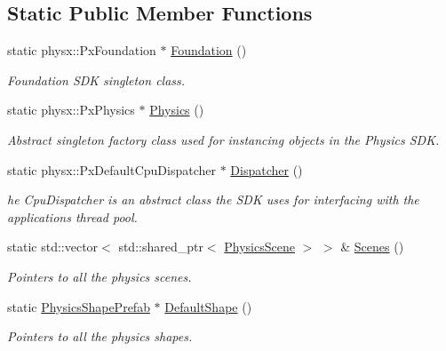 \subsection*{Static Public Member Functions}
\begin{DoxyCompactItemize}
\item 
static physx\+::\+Px\+Foundation $\ast$ \mbox{\hyperlink{classrev_1_1_physics_manager_a3c3cdc497203c68d9189d1a2baf97e54}{Foundation}} ()
\begin{DoxyCompactList}\small\item\em Foundation S\+DK singleton class. \end{DoxyCompactList}\item 
static physx\+::\+Px\+Physics $\ast$ \mbox{\hyperlink{classrev_1_1_physics_manager_af406b7c9e1807bd55d25a2c3cc74a5ff}{Physics}} ()
\begin{DoxyCompactList}\small\item\em Abstract singleton factory class used for instancing objects in the Physics S\+DK. \end{DoxyCompactList}\item 
static physx\+::\+Px\+Default\+Cpu\+Dispatcher $\ast$ \mbox{\hyperlink{classrev_1_1_physics_manager_a28fdf900280695b969f127fab9c3e7f6}{Dispatcher}} ()
\begin{DoxyCompactList}\small\item\em he Cpu\+Dispatcher is an abstract class the S\+DK uses for interfacing with the application\textquotesingle{}s thread pool. \end{DoxyCompactList}\item 
\mbox{\label{classrev_1_1_physics_manager_a823d9349e40c0c08845bf3ae6db149fb}} 
static std\+::vector$<$ std\+::shared\+\_\+ptr$<$ \mbox{\hyperlink{classrev_1_1_physics_scene}{Physics\+Scene}} $>$ $>$ \& \mbox{\hyperlink{classrev_1_1_physics_manager_a823d9349e40c0c08845bf3ae6db149fb}{Scenes}} ()
\begin{DoxyCompactList}\small\item\em Pointers to all the physics scenes. \end{DoxyCompactList}\item 
static \mbox{\hyperlink{classrev_1_1_physics_shape_prefab}{Physics\+Shape\+Prefab}} $\ast$ \mbox{\hyperlink{classrev_1_1_physics_manager_ab57f5c4ff1ac9039a876ae1d2ce26978}{Default\+Shape}} ()
\begin{DoxyCompactList}\small\item\em Pointers to all the physics shapes. \end{DoxyCompactList}\item 

\end{DoxyCompactItemize}

